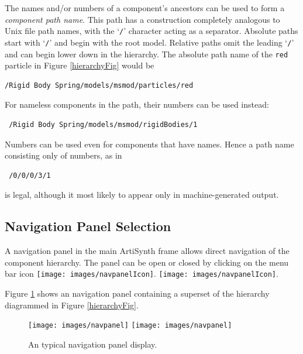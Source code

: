 \documentclass{article}
\begin{document}
The names and/or numbers of a component's ancestors can be used to
form a {\it component path name}. This path has a construction completely
analogous to Unix file path names, with the `{\tt /}' character acting as
a separator. Absolute paths start with `{\tt /}' and begin with the root
model. Relative paths omit the leading `{\tt /}' and can begin lower down
in the hierarchy.  The absolute path name of the {\tt red} particle in
Figure \ref{hierarchyFig} would be

\begin{verbatim}
/Rigid Body Spring/models/msmod/particles/red
\end{verbatim}

For nameless components in the path, their
numbers can be used instead:

\begin{verbatim}
 /Rigid Body Spring/models/msmod/rigidBodies/1
\end{verbatim}

Numbers can be used even for components that have names.
Hence a path name consisting only of numbers, as in

\begin{verbatim}
 /0/0/0/3/1
\end{verbatim}

is legal, although it most likely to appear only in machine-generated
output.

\subsection{Navigation Panel Selection}
\label{navPanelSec}

A navigation panel in the main ArtiSynth frame allows direct
navigation of the component hierarchy. The panel can be
open or closed by clicking on the menu bar icon 
\iflatexml
\texttt{[image: images/navpanelIcon]}.
\else
\texttt{[image: images/navpanelIcon]}.
\fi

Figure \ref{navpanelFig} shows an navigation panel containing a superset
of the hierarchy diagrammed in Figure \ref{hierarchyFig}.

\begin{figure}
\begin{center}
\iflatexml
\texttt{[image: images/navpanel]}
\else
\texttt{[image: images/navpanel]}
\fi
\end{center}
\caption{An typical navigation panel display.}%
\label{navpanelFig}
\end{figure}
\end{document}
